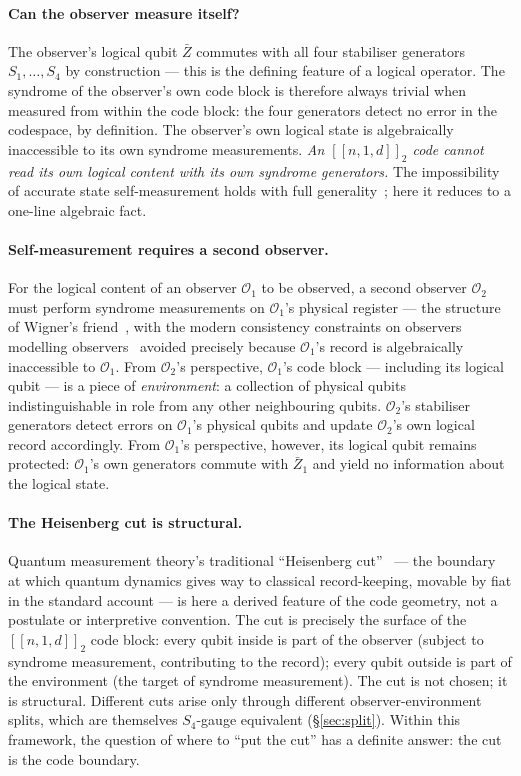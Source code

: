 \documentclass[11pt,a4paper]{article}
\newcommand{\Op}{\mathcal{O}}
\begin{document}
\paragraph{Can the observer measure itself?}
The observer's logical qubit $\bar Z$ commutes with all four stabiliser generators $S_1,\ldots,S_4$ by construction --- this is the defining feature of a logical operator. The syndrome of the observer's own code block is therefore always trivial when measured from within the code block: the four generators detect no error in the codespace, by definition. The observer's own logical state is algebraically inaccessible to its own syndrome measurements. \emph{An $[\![n,1,d]\!]_2$ code cannot read its own logical content with its own syndrome generators.} The impossibility of accurate state self-measurement holds with full generality~\cite{Breuer1995}; here it reduces to a one-line algebraic fact.

\paragraph{Self-measurement requires a second observer.}
For the logical content of an observer $\Op_1$ to be observed, a second observer $\Op_2$ must perform syndrome measurements on $\Op_1$'s physical register --- the structure of Wigner's friend~\cite{Wigner1961}, with the modern consistency constraints on observers modelling observers~\cite{FrauchigerRenner2018} avoided precisely because $\Op_1$'s record is algebraically inaccessible to $\Op_1$. From $\Op_2$'s perspective, $\Op_1$'s code block --- including its logical qubit --- is a piece of \emph{environment}: a collection of physical qubits indistinguishable in role from any other neighbouring qubits. $\Op_2$'s stabiliser generators detect errors on $\Op_1$'s physical qubits and update $\Op_2$'s own logical record accordingly. From $\Op_1$'s perspective, however, its logical qubit remains protected: $\Op_1$'s own generators commute with $\bar Z_1$ and yield no information about the logical state.

\paragraph{The Heisenberg cut is structural.}
Quantum measurement theory's traditional ``Heisenberg cut''~\cite{vNeumannQM,Heisenberg1958} --- the boundary at which quantum dynamics gives way to classical record-keeping, movable by fiat in the standard account --- is here a derived feature of the code geometry, not a postulate or interpretive convention. The cut is precisely the surface of the $[\![n,1,d]\!]_2$ code block: every qubit inside is part of the observer (subject to syndrome measurement, contributing to the record); every qubit outside is part of the environment (the target of syndrome measurement). The cut is not chosen; it is structural. Different cuts arise only through different observer-environment splits, which are themselves $S_4$-gauge equivalent (\S\ref{sec:split}). Within this framework, the question of where to ``put the cut'' has a definite answer: the cut is the code boundary.
\end{document}
